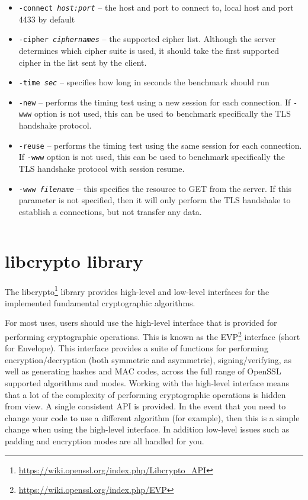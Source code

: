 \begin{itemize}
  \item \texttt{-connect \textit{host:port}} -- the host and port to connect to, local host and port 4433 by default
  \item \texttt{-cipher \textit{ciphernames}} -- the supported cipher list. Although the server determines which cipher suite is used, it should take the first supported cipher in the list sent by the client.
  \item \texttt{-time \textit{sec}} -- specifies how long in seconds the benchmark should run
  \item \texttt{-new} -- performs the timing test using a new session for each connection. If \texttt{-www} option is not used, this can be used to benchmark specifically the TLS handshake protocol.
  \item \texttt{-reuse} -- performs the timing test using the same session for each connection. If \texttt{-www} option is not used, this can be used to benchmark specifically the TLS handshake protocol with session resume.
  \item \texttt{-www \textit{filename}} -- this specifies the resource to GET from the server. If this parameter is not specified, then it will only perform the TLS handshake to establish a connections, but not transfer any data.
\end{itemize}

\inputminted{text}{code/openssl-s_time-example.txt}


\section{libcrypto library}
\label{toc/openssl-libcrypto}

The libcrypto\footnote{\url{https://wiki.openssl.org/index.php/Libcrypto_API}} library provides high-level and low-level interfaces for the implemented fundamental cryptographic algorithms.

For most uses, users should use the high-level interface that is provided for performing cryptographic operations. This is known as the EVP\footnote{\url{https://wiki.openssl.org/index.php/EVP}} interface (short for Envelope). This interface provides a suite of functions for performing encryption/decryption (both symmetric and asymmetric), signing/verifying, as well as generating hashes and MAC codes, across the full range of OpenSSL supported algorithms and modes. Working with the high-level interface means that a lot of the complexity of performing cryptographic operations is hidden from view. A single consistent API is provided. In the event that you need to change your code to use a different algorithm (for example), then this is a simple change when using the high-level interface. In addition low-level issues such as padding and encryption modes are all handled for you.

